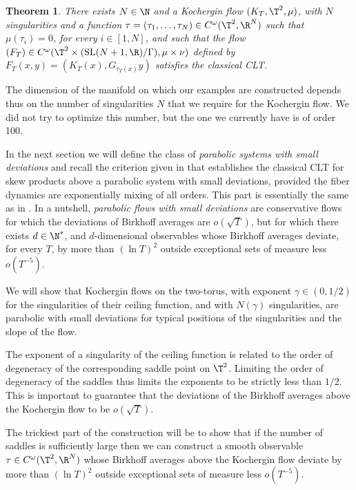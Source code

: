 \documentclass[JEP,XML,SOM,Unicode,NoFloatCountersInSection]{cedram}
\newcommand\SL{\mathrm{SL}}
\theoremstyle{definition}
\theoremstyle{plain}
\newtheorem{Main}{Theorem}
\begin{document}
\begin{Main} \label{thm:main22} There exists $N\in \N$ and a Kochergin flow $(K_T,\T^2,\mu)$,
with $N$ singularities and a function $\tau=(\tau_1,\ldots,\tau_{N}) \in C^\omega(\T^2,\R^{N})$ such that $\mu(\tau_i)=0$, for every $i\in [1,N]$, and such that the flow
$(F_T)\in C^\omega(\T^2\times (\SL(N+1,\R)/\Gamma),\mu\times \nu)$
defined by $F_T(x,y)=(K_T(x),G_{\tau_T(x)}y)$
satisfies the classical CLT.
\end{Main}

The dimension of the manifold on which our examples are constructed depends thus on the number of singularities $N$ that we require for the Kochergin flow. We did not try to optimize this number, but the one we currently have is of order 100.

In the next section we will define the class of {\it parabolic systems with small deviations} and recall the criterion given in \cite{DDKN} that establishes the classical CLT for skew products above a parabolic system with small deviations, provided the fiber dynamics are exponentially mixing of all orders. This part is essentially the same as in \cite{DDKN}. In a nutshell, {\it parabolic flows with small deviations} are conservative flows for which the deviations of Birkhoff averages are $o(\sqrt{T})$, but for which there exists $d \in \N^*$, and $d$-dimensional observables whose Birkhoff averages deviate, for every $T$, by more than $(\ln T)^2$ outside exceptional sets of measure less $o(T^{-5})$.

We will show that Kochergin flows on the two-torus, with exponent $\gamma\in (0,1/2)$ for the singularities of their ceiling function, and with $N(\gamma)$ singularities, are parabolic with small deviations for typical positions of the singularities and the slope of the flow.

The exponent of a singularity of the ceiling function is related to the order of degeneracy of the corresponding saddle point on $\T^2$. Limiting the order of degeneracy of the saddles thus limits the exponents to be strictly less than $1/2$. This is important to guarantee that the deviations of the Birkhoff averages above the Kochergin flow to be $o(\sqrt{T})$.

The trickiest part of the construction will be to show that if the number of saddles is sufficiently large then we can construct a smooth observable $\tau\in C^\omega(\T^2,\R^{N})$ whose Birkhoff averages above the Kochergin flow deviate by more than $(\ln T)^2$ outside exceptional sets of measure less $o(T^{-5})$.
\end{document}
